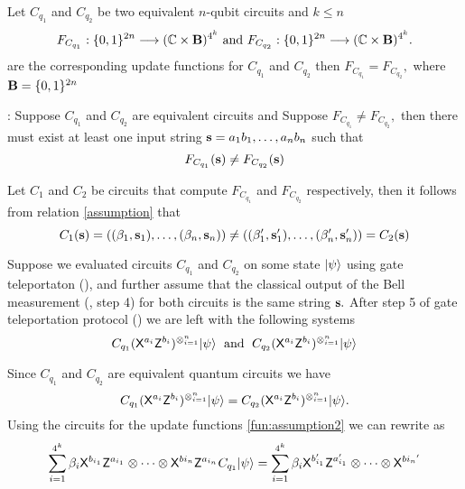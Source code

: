 \begin{lemma}
\label{lemma:nqubit}
Let $C_{q_1}$ and $C_{q_2}$ be two equivalent $n$-qubit circuits  and $k\leq n$
\begin{equation*}
 F_{C_{q_1}}:\{0,1\}^{2n}\longrightarrow  (\mathbb{C} \times {\bf B})^{4^k} \mbox{ and }
  F_{C_{q_2}}:\{0,1\}^{2n}\longrightarrow  (\mathbb{C} \times {\bf B})^{4^k}. 
\end{equation*}
are the corresponding update functions for $C_{q_1}$ and $C_{q_2}$  then $F_{C_{q_1}}=F_{C_{q_2}},$ where ${\bf B}=\{0,1\}^{2n}$
\end{lemma}

: Suppose $C_{q_1}$ and $C_{q_2}$ are equivalent circuits and Suppose $F_{C_{q_1}}\neq F_{C_{q_2}},$  then there must exist at least one input string ${\bf s}=a_1b_1,\ldots, a_nb_n$ such that
\begin{equation}
\label{assumption}
F_{C_{q_1}}({\bf s})\neq F_{C_{q_2}}({\bf s})
\end{equation}

Let $C_1$ and $C_2$ be circuits that compute $F_{C_{q_1}}$ and $F_{C_{q_2}}$ respectively, then it follows from relation \ref{assumption} that
\begin{equation}
\label{fun:assumption2}
C_1({\bf s)}=((\beta_1, {\bf s}_1),\ldots, (\beta_n, {\bf s}_n))\neq ((\beta_1^\prime, {\bf s}_1^\prime),\ldots, (\beta_n^\prime, {\bf s}_n^\prime))=C_2({\bf s})
\end{equation}

Suppose we evaluated circuits $C_{q_1}$ and $C_{q_2}$ on some state ${\lvert}\psi\rangle$ using gate teleportaton (), and further assume that the classical output of the Bell measurement (, step 4) for both circuits is the same string ${\bf s}.$ After step 5 of gate teleportation protocol () we are left with the following systems
 \begin{equation*}
C_{q_1} ({\sf X}^{a_{i}}{\sf Z}^{b_{i}})^{\otimes_{i=1}^{n}}{\lvert}\psi\rangle \;\mbox{ and }\;
C_{q_2} ({\sf X}^{a_{i}}{\sf Z}^{b_{i}})^{\otimes_{i=1}^{n}}{\lvert}\psi\rangle
\end{equation*}

Since $C_{q_1}$ and $C_{q_2}$ are equivalent quantum circuits we have
 \begin{equation}
 \label{nqubit:eq10}
C_{q_1} ({\sf X}^{a_{i}}{\sf Z}^{b_{i}})^{\otimes_{i=1}^{n}}{\lvert}\psi\rangle=C_{q_2} ({\sf X}^{a_{i}}{\sf Z}^{b_{i}})^{\otimes_{i=1}^{n}}{\lvert}\psi\rangle.
\end{equation}
Using the circuits for the update functions \ref{fun:assumption2} we can rewrite  as
\begin{equation}
 \label{nqubit:eq11}
\sum_{i=1}^{4^k} \beta_i {\sf X}^{b_{i_1}} {\sf Z}^{a_{i_1}}\otimes \cdots \otimes {\sf X}^{b{i_n}} {\sf Z}^{a_{i_n}}C_{q_1}{\lvert}\psi\rangle=\sum_{i=1}^{4^k} \beta_i {\sf X}^{b_{i_1}^\prime} {\sf Z}^{a_{i_1}^\prime}\otimes \cdots \otimes {\sf X}^{b{i_n}^\prime} 
\end{equation}

